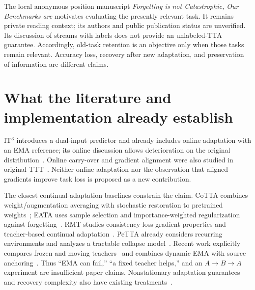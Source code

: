 \documentclass[11pt,a4paper]{article}
\begin{document}
The local anonymous position manuscript \emph{Forgetting is not Catastrophic,
Our Benchmarks are} motivates evaluating the presently relevant task.
It remains private reading context; its authors and public publication
status are unverified. Its discussion of streams with labels does not
provide an unlabeled-TTA guarantee. Accordingly, old-task retention is an
objective only when those tasks remain relevant. Accuracy loss, recovery
after new adaptation, and preservation of information are different claims.

\section{What the literature and implementation already establish}
IT$^3$ introduces a dual-input predictor and already includes online
adaptation with an EMA reference; its online discussion allows deterioration
on the original distribution~\cite{it3}. Online carry-over and gradient
alignment were also studied in original TTT~\cite{ttt}. Neither online
adaptation nor the observation that aligned gradients improve task loss
is proposed as a new contribution.

The closest continual-adaptation baselines constrain the claim. CoTTA
combines weight/augmentation averaging with stochastic restoration to
pretrained weights~\cite{cotta}; EATA uses sample selection and
importance-weighted regularization against forgetting~\cite{eata}.
RMT studies consistency-loss gradient properties and teacher-based
continual adaptation~\cite{rmt}. PeTTA already considers recurring
environments and analyzes a tractable collapse model~\cite{petta}.
Recent work explicitly compares frozen and moving teachers~\cite{fixedteacher}
and combines dynamic EMA with source anchoring~\cite{desa}. Thus ``EMA can
fail,'' ``a fixed teacher helps,'' and an $A\to B\to A$ experiment are
insufficient paper claims. Nonstationary adaptation guarantees and recovery
complexity also have existing treatments~\cite{realign,recovery}.
\end{document}
